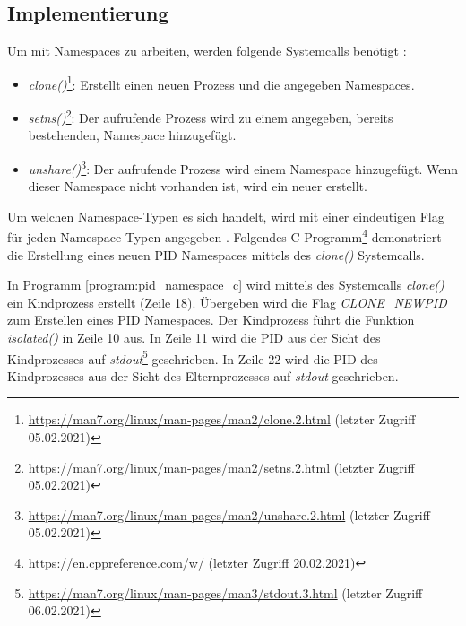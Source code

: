 \subsection{Implementierung}
\label{Implementierung}

Um mit Namespaces zu arbeiten, werden folgende Systemcalls
benötigt \cite{man_namespaces}:

\begin{itemize}
  \item
    \emph{clone()}\footnote{\url{https://man7.org/linux/man-pages/man2/clone.2.html}
    (letzter Zugriff 05.02.2021)}: Erstellt einen neuen Prozess und die
    angegeben Namespaces.
  \item
    \emph{setns()}\footnote{\url{https://man7.org/linux/man-pages/man2/setns.2.html}
    (letzter Zugriff 05.02.2021)}: Der aufrufende Prozess wird zu einem
    angegeben, bereits bestehenden, Namespace hinzugefügt.
  \item
    \emph{unshare()}\footnote{\url{https://man7.org/linux/man-pages/man2/unshare.2.html}
    (letzter Zugriff 05.02.2021)}: Der aufrufende Prozess wird einem Namespace
    hinzugefügt. Wenn dieser Namespace nicht vorhanden ist, wird ein neuer
    erstellt.
\end{itemize}

Um welchen Namespace-Typen es sich handelt, wird mit einer eindeutigen Flag für
jeden Namespace-Typen angegeben \cite{man_namespaces}. Folgendes
C-Programm\footnote{\url{https://en.cppreference.com/w/} (letzter Zugriff
20.02.2021)} demonstriert die Erstellung eines neuen PID Namespaces mittels des
\emph{clone()} Systemcalls.



In Programm \ref{program:pid_namespace_c} wird mittels des Systemcalls
\emph{clone()} ein Kindprozess
erstellt (Zeile 18). Übergeben wird die Flag \emph{CLONE\_NEWPID} zum Erstellen eines PID
Namespaces. Der Kindprozess führt die Funktion \emph{isolated()} in Zeile 10
aus. In Zeile 11 wird die PID aus der Sicht des Kindprozesses auf
\emph{stdout}\footnote{\url{https://man7.org/linux/man-pages/man3/stdout.3.html} (letzter
Zugriff 06.02.2021)} geschrieben. In Zeile 22 wird die PID des Kindprozesses
aus der Sicht des Elternprozesses auf \emph{stdout} geschrieben.




